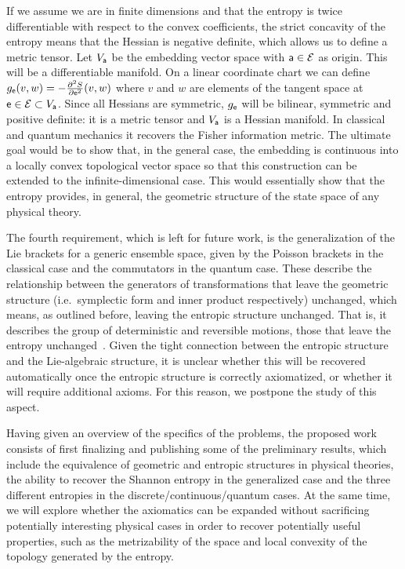 If we assume we are in finite dimensions and that the entropy is twice differentiable with respect to the convex coefficients, the strict concavity of the entropy means that the Hessian is negative definite, which allows us to define a metric tensor. Let $V_{\ens[a]}$ be the embedding vector space with $\ens[a] \in \Ens$ as origin. This will be a differentiable manifold. On a linear coordinate chart we can define $g_{\ens}( v, w ) = - \frac{\partial^2 S}{\partial \ens ^2}( v, w )$ where $v$ and $w$ are elements of the tangent space at $\ens \in \Ens \subset V_{\ens[a]}$. Since all Hessians are symmetric, $g_{\ens}$ will be bilinear, symmetric and positive definite: it is a metric tensor and $V_{\ens[a]}$ is a Hessian manifold. In classical and quantum mechanics it recovers the Fisher information metric. The ultimate goal would be to show that, in the general case, the embedding is continuous into a locally convex topological vector space so that this construction can be extended to the infinite-dimensional case. This would essentially show that the entropy provides, in general, the geometric structure of the state space of any physical theory.

The fourth requirement, which is left for future work, is the generalization of the Lie brackets for a generic ensemble space, given by the Poisson brackets in the classical case and the commutators in the quantum case. These describe the relationship between the generators of transformations that leave the geometric structure (i.e.~symplectic form and inner product respectively) unchanged, which means, as outlined before, leaving the entropic structure unchanged. That is, it describes the group of deterministic and reversible motions, those that leave the entropy unchanged~\cite{aop-HamConsInfoEnt,aop-HamQuantInfo,aop-book}. Given the tight connection between the entropic structure and the Lie-algebraic structure, it is unclear whether this will be recovered automatically once the entropic structure is correctly axiomatized, or whether it will require additional axioms. For this reason, we postpone the study of this aspect.

Having given an overview of the specifics of the problems, the proposed work consists of first finalizing and publishing some of the preliminary results, which include the equivalence of geometric and entropic structures in physical theories, the ability to recover the Shannon entropy in the generalized case and the three different entropies in the discrete/continuous/quantum cases. At the same time, we will explore whether the axiomatics can be expanded without sacrificing potentially interesting physical cases in order to recover potentially useful properties, such as the metrizability of the space and local convexity of the topology generated by the entropy.

